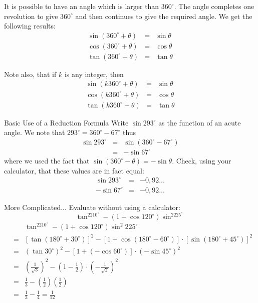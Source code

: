 It is possible to have an angle which is larger than $360^\circ$. The angle completes one revolution to give $360^\circ$ and then continues to give the required angle. We get the following results:
\begin{eqnarray*}
 \sin(360^\circ+\theta) &=& \sin\theta \\
 \cos(360^\circ+\theta) &=& \cos\theta \\
 \tan(360^\circ+\theta) &=& \tan\theta
\end{eqnarray*}

Note also, that if $k$ is any integer, then
\begin{eqnarray*}
 \sin(k360^\circ +\theta) &=& \sin\theta \\
 \cos(k360^\circ +\theta) &=& \cos\theta \\
 \tan(k360^\circ +\theta) &=& \tan\theta
\end{eqnarray*}

\begin{wex}{Basic Use of a Reduction Formula}
{%
Write $\sin 293^\circ$ as the function of an acute angle.
}%
{%
We note that $293^\circ = 360^\circ -67^\circ$ thus
\begin{eqnarray*}
 \sin 293^\circ & = & \sin (360^\circ - 67^\circ)\\
 & =& -\sin 67^\circ 
\end{eqnarray*}
where we used the fact that $ \sin (360^\circ -\theta) = -\sin\theta$. Check, using your calculator, that these values are in fact equal:
\begin{eqnarray*}
\sin 293^\circ &=& -0,92\ldots \\
-\sin 67^\circ &=& -0,92\ldots
\end{eqnarray*}
}%
\end{wex}

\begin{wex}{More Complicated...}
{%
Evaluate without using a calculator: 
\[\tan^2210^\circ-(1+\cos 120^\circ)\sin ^2225^\circ\]
}%
{%
\begin{eqnarray*}
& & \tan^2210^\circ-(1+\cos 120^\circ)\sin^2 225^\circ\\
&=& [\tan(180^\circ+30^\circ)]^2-[1+\cos(180^\circ-60^\circ)]\cdot[ \sin(180^\circ+45^\circ)]^2\\
&=& (\tan 30^\circ)^2 - [1+(-\cos 60^\circ)] \cdot (-\sin 45^\circ)^2\\
&=& \left( \frac{1}{\sqrt{3}} \right)^2 - \left(1-\frac{1}{2}\right)\cdot \left( -\frac{1}{\sqrt{2}}\right)^2 \\
&=& \frac{1}{3} - \left( \frac{1}{2} \right) \left(\frac{1}{2} \right) \\
&=& \frac{1}{3} - \frac{1}{4} = \frac{1}{12}
\end{eqnarray*}
}%
\end{wex}

